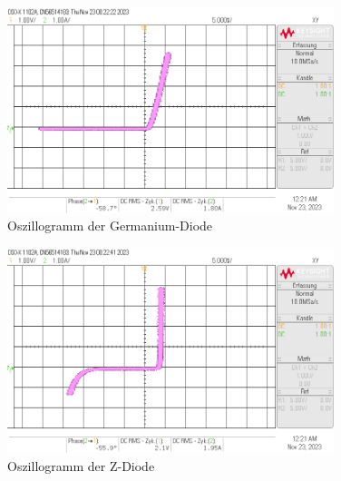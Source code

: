 \begin{enumerate}[label=\alph*)]
	      \begin{figure}[h!]
		      \begin{center}
			      \includegraphics[width=0.85\textwidth]{img/V1/3.2.Diode_Ge.png}
			      \caption{Oszillogramm der Germanium-Diode}
		      \end{center}
	      \end{figure}

	      \pagebreak
	      \begin{figure}[h!]
		      \begin{center}
			      \includegraphics[width=0.85\textwidth]{img/V1/3.2.Diode_Ze.png}
			      \caption{Oszillogramm der Z-Diode}
		      \end{center}
	      \end{figure}


\end{enumerate}
